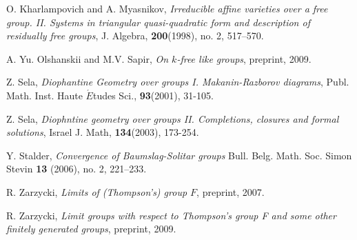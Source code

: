 \documentclass[11pt]{amsart}
\begin{document}
\begin{thebibliography}{CCC}
O. Kharlampovich and A. Myasnikov, {\em Irreducible affine varieties over a free group. II. Systems in triangular quasi-quadratic form and description of residually free groups}, J. Algebra, \textbf{200}(1998), no. 2, 517--570.

 A. Yu. Olshanskii and M.V. Sapir, {\em On $k$-free like groups}, preprint, 2009.

Z. Sela, {\em Diophantine Geometry over groups I. Makanin-Razborov diagrams}, Publ. Math. Inst. Haute $\acute{E}$tudes Sci., \textbf{93}(2001), 31-105.

Z. Sela, {\em Diophntine geometry over groups II. Completions, closures and formal solutions},  Israel J. Math, \textbf{134}(2003), 173-254.

 Y. Stalder, {\em Convergence of Baumslag-Solitar
groups}  Bull. Belg. Math. Soc. Simon Stevin \textbf{13} (2006),
no. 2, 221--233.

 R. Zarzycki, {\em Limits of (Thompson's) group $F$}, preprint, 2007.

 R. Zarzycki, {\em Limit groups with respect to Thompson's group F and some other finitely generated groups}, preprint, 2009.

\end{thebibliography}
\end{document}
